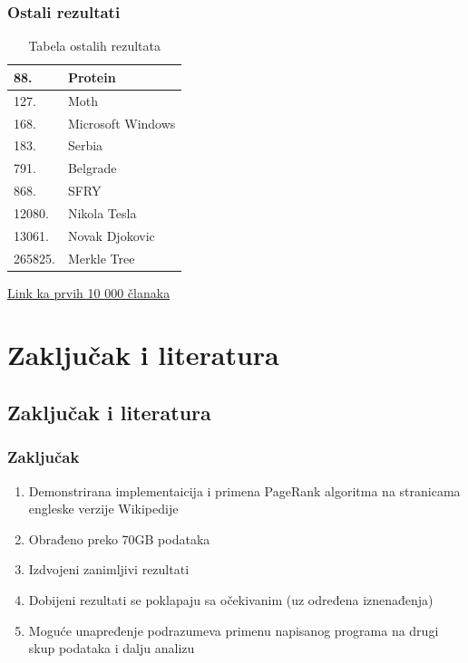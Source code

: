 \documentclass[11pt]{beamer}
\begin{document}
\begin{frame}
     \frametitle{Ostali rezultati}
\begin{table}[]
\large
\centering
\begin{tabular}{|l|l|}
\hline
88.                  & Protein \\ \hline
127.                 & Moth \\ \hline
168.                 & Microsoft Windows \\ \hline
183.                 & Serbia  \\ \hline
791.                 & Belgrade \\ \hline
868.                 & SFRY \\ \hline
12080.               & Nikola Tesla \\ \hline 
13061.               & Novak Djokovic \\ \hline 
265825.              & Merkle Tree \\ \hline 
\end{tabular}
\caption{Tabela ostalih rezultata}
\label{tabelazanimljivi}
\end{table}

\begin{center}
    \href{https://github.com/FilipVesovic/WikiRank/blob/master/WikiRank_Top10K.txt}{Link ka prvih 10 000 članaka} 
\end{center}
\end{frame}

\section{Zaključak i literatura}
\subsection{Zaključak i literatura}

\begin{frame}
\frametitle{Zaključak}
\begin{center}
    \begin{enumerate}
        \item Demonstrirana implementaicija i primena PageRank algoritma na stranicama engleske verzije Wikipedije
        \item Obrađeno preko 70GB podataka
        \item Izdvojeni zanimljivi rezultati
        \item Dobijeni rezultati se poklapaju sa očekivanim (uz određena iznenađenja)
        \item Moguće unapređenje podrazumeva primenu napisanog programa na drugi skup podataka i dalju analizu
    \end{enumerate}
\end{center}
\end{frame}
\end{document}
